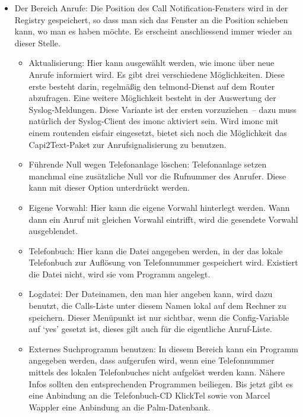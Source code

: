 \begin{itemize}
  \item Der Bereich Anrufe: Die Position des Call Notification-Fensters wird in 
    der Registry gespeichert, so dass man sich das Fenster an die Position 
    schieben kann, wo man es haben möchte. Es erscheint anschliessend immer 
    wieder an dieser Stelle.
    \begin{itemize}
      \item Aktualisierung: Hier kann ausgewählt werden, wie imonc über neue
        Anrufe informiert wird. Es gibt drei verschiedene Möglichkeiten. Diese
        erste besteht darin, regelmäßig den telmond-Dienst auf dem Router 
        abzufragen. Eine weitere Möglichkeit besteht in der Auswertung der 
        Syslog-Meldungen. Diese Variante ist der ersten vorzuziehen~-- dazu muss
        natürlich der Syslog-Client des imonc aktiviert sein. Wird imonc mit 
        einem routenden eisfair eingesetzt, bietet sich noch die Möglichkeit das
        Capi2Text-Paket zur Anrufsignalisierung zu benutzen.
      \item Führende Null wegen Telefonanlage löschen: Telefonanlage setzen 
        manchmal eine zusätzliche Null vor die Rufnummer des Anrufer. Diese kann 
        mit dieser Option unterdrückt werden.
      \item Eigene Vorwahl: Hier kann die eigene Vorwahl hinterlegt werden. Wann 
        dann ein Anruf mit gleichen Vorwahl eintrifft, wird die gesendete 
        Vorwahl ausgeblendet.
      \item Telefonbuch: Hier kann die Datei angegeben werden, in der das lokale 
        Telefonbuch zur Auflösung von Telefonnummer gespeichert wird. Existiert 
        die Datei nicht, wird sie vom Programm angelegt.
      \item Logdatei: Der Dateinamen, den man hier angeben kann, wird dazu 
        benutzt, die Calls-Liste unter diesem Namen lokal auf dem Rechner zu 
        speichern. Dieser Menüpunkt ist nur sichtbar, wenn die Config-Variable 
         auf `yes' gesetzt ist, dieses gilt auch für die 
        eigentliche Anruf-Liste.
      \item Externes Suchprogramm benutzen: In diesem Bereich kann ein Programm
        angegeben werden, dass aufgerufen wird, wenn eine Telefonnummer mittels 
        des lokalen Telefonbuches nicht aufgelöst werden kann. Nähere Infos 
        sollten den entsprechenden Programmen beiliegen. Bis jetzt gibt es eine 
        Anbindung an die Telefonbuch-CD KlickTel sowie von Marcel Wappler eine 
        Anbindung an die Palm-Datenbank.
    \end{itemize}


\end{itemize}
